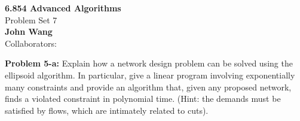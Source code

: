 \documentclass[psamsfonts]{amsart}
\newenvironment{sol}{\vspace{0.25cm}{\large \bfseries Solution:}}{\qedsymbol}
\newenvironment{prob}[1]{\begin{framed}{\large \bfseries Problem #1:}}{\end{framed}}
\newcommand{\makenewtitle}{
    \begin{center}
    {\huge \bfseries 6.854 Advanced Algorithms} \\
    Problem Set 7\\
    \vspace{0.25cm}
    {\bfseries John Wang} \\
    Collaborators: 
    \end{center}
    \vspace{0.5cm}
}
\begin{document}
\newpage
\makenewtitle

\begin{prob}{5-a}
Explain how a network design problem can be solved using the ellipsoid algorithm. In particular, give a linear program involving exponentially many constraints and provide an algorithm that, given any proposed network, finds a violated constraint in polynomial time. (Hint: the demands must be satisfied by flows, which are intimately related to cuts).
\end{prob}
\begin{sol}
\end{sol}
\end{document}
